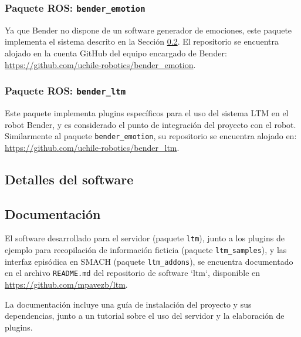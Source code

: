 \subsubsection{Paquete ROS: \texttt{bender\_emotion}}

Ya que Bender no dispone de un software generador de emociones, este paquete implementa el sistema descrito en la Sección \ref{}. El repositorio se encuentra alojado en la cuenta GitHub del equipo encargado de Bender: \url{https://github.com/uchile-robotics/bender\_emotion}.

\subsubsection{Paquete ROS: \texttt{bender\_ltm}}

Este paquete implementa plugins específicos para el uso del sistema LTM en el robot Bender, y es considerado el punto de integración del proyecto con el robot. Similarmente al paquete \texttt{bender\_emotion}, su repositorio se encuentra alojado en: \url{https://github.com/uchile-robotics/bender\_ltm}.




\subsection{Detalles del software}





\subsection{Documentación}

El software desarrollado para el servidor (paquete \texttt{ltm}), junto a los plugins de ejemplo para recopilación de información ficticia (paquete \texttt{ltm\_samples}), y las interfaz episódica en SMACH (paquete \texttt{ltm\_addons}), se encuentra documentado en el archivo \texttt{README.md} del repositorio de software `ltm`, disponible en  \url{https://github.com/mpavezb/ltm}.

La documentación incluye una guía de instalación del proyecto y sus dependencias, junto a un tutorial sobre el uso del servidor y la elaboración de plugins.

